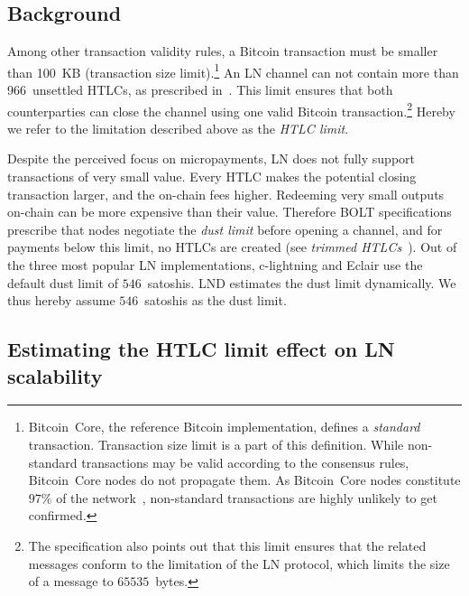 \subsection{Background} \label{max-htlc-background}

Among other transaction validity rules, a Bitcoin transaction must be smaller than 100~KB (transaction size limit\cite{StandardTxBitcoinSE, BitcoinCoreMaxTxWeight}).\footnote{Bitcoin~Core, the reference Bitcoin implementation, defines a \textit{standard} transaction. Transaction size limit is a part of this definition. While non-standard transactions may be valid according to the consensus rules, Bitcoin~Core nodes do not propagate them. As Bitcoin~Core nodes constitute $97\%$ of the network~\cite{CoinDance}, non-standard transactions are highly unlikely to get confirmed.}
An LN channel can not contain more than 966~unsettled HTLCs, as prescribed in~\cite{BOLT2Rationale}.
This limit ensures that both counterparties can close the channel using one valid Bitcoin transaction.\footnote{The specification also points out that this limit ensures that the related messages conform to the limitation of the LN protocol, which limits the size of a message to $65535$~bytes.}
Hereby we refer to the limitation described above as the \textit{HTLC limit}.

Despite the perceived focus on micropayments, LN does not fully support transactions of very small value.
Every HTLC makes the potential closing transaction larger, and the on-chain fees higher.
Redeeming very small outputs on-chain can be more expensive than their value.
Therefore BOLT specifications prescribe that nodes negotiate the \textit{dust limit} before opening a channel, and for payments below this limit, no HTLCs are created (see \textit{trimmed HTLCs}~\cite{BOLT3Trimmed}).
Out of the three most popular LN implementations, c-lightning and Eclair use the default dust limit of $546$~satoshis.
LND estimates the dust limit dynamically.
We thus hereby assume $546$~satoshis as the dust limit.



\subsection{Estimating the HTLC limit effect on LN scalability}	\label{estimating-concurrent channel updates}

